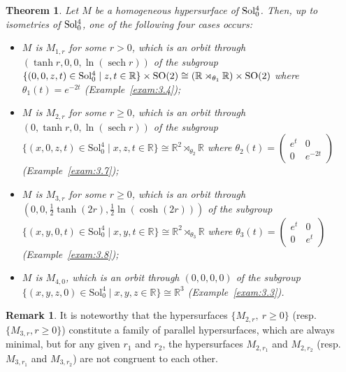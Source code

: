 \documentclass[reqno]{amsart}%
\DeclareMathOperator{\sech}{sech}
\newtheorem{theorem}{Theorem}[section]   %
\theoremstyle{definition}
\newtheorem{remark}{Remark}[section]
\numberwithin{equation}{section}
\begin{document}
	\begin{theorem}\label{thm:1.2}
		Let $M$ be a homogeneous hypersurface of ${\rm Sol_0^4}$.
		Then, up to isometries of ${\rm Sol_0^4}$, one of the
		following four cases occurs:
		\begin{itemize}
			
			\vskip1mm
			\item[(1)]
			$M$ is $M_{1,r}$ for some $r>0$, which is an orbit through $(\tanh r,0,0,\ln(\sech r))$ of the subgroup 
			$\{(0,0,z,t)\in {\rm Sol_0^4}\mid z,t\in \mathbb{R}\}\times {\rm SO(2)} \cong (\mathbb R \rtimes_{\theta_1} \mathbb R) \times \rm{SO}(2)$ where $\theta_1(t) = e^{-2t}$ (Example~\ref{exam:3.4});
			
			\vskip1mm
			\item[(2)]
			$M$ is $M_{2,r}$ for some $r\geq0$, which is an orbit through $(0,\tanh r,0,\ln(\sech r))$ of the subgroup 
			$\{(x,0,z,t)\in\mathrm{Sol}^4_0 \mid x,z,t \in \mathbb R \} \cong \mathbb R^2 \rtimes_{\theta_2} \mathbb R$ 
			where $\theta_2(t) = \left(\begin{smallmatrix} e^{t} & 0 \\ 0 & e^{-2t} \end{smallmatrix}\right)$ (Example~\ref{exam:3.7});
			
			\vskip1mm
			\item[(3)]
			$M$ is $M_{3,r}$ for some $r\geq0$, which is an orbit through $(0,0,\tfrac12 \tanh(2r),\tfrac12 \ln(\cosh(2r)))$ 
			of the subgroup 
			$\{(x,y,0,t)\in\mathrm{Sol}^4_0 \mid x,y,t \in \mathbb R\} \cong \mathbb R^2 \rtimes_{\theta_3} \mathbb R$ where $\theta_3(t) = \left(\begin{smallmatrix} e^{t} & 0 \\ 0 & e^{t} \end{smallmatrix}\right)$ (Example~\ref{exam:3.8});
			
			\vskip1mm
			\item[(4)]
			$M$ is $M_{4,0}$, which is an orbit through $(0,0,0,0)$ of the subgroup
			$\{(x,y,z,0) \in \mathrm{Sol}^4_0 \mid x,y,z \in \mathbb R\} \cong \mathbb R^3$ (Example~\ref{exam:3.3}).
		\end{itemize}
	\end{theorem}
	
	
	\begin{remark}\label{rm:1.1}
		It is noteworthy that the hypersurfaces $\{M_{2,r},\ r\geq0\}$
		(resp. $\{M_{3,r}, r\geq0\}$) constitute a family of parallel hypersurfaces, which are always
		minimal, but for any given $r_1$ and $r_2$, the hypersurfaces $M_{2,r_1}$ and $M_{2,r_2}$
		(resp. $M_{3,r_1}$ and $M_{3,r_2}$) are not congruent to each other.
	\end{remark}
	
\end{document}
